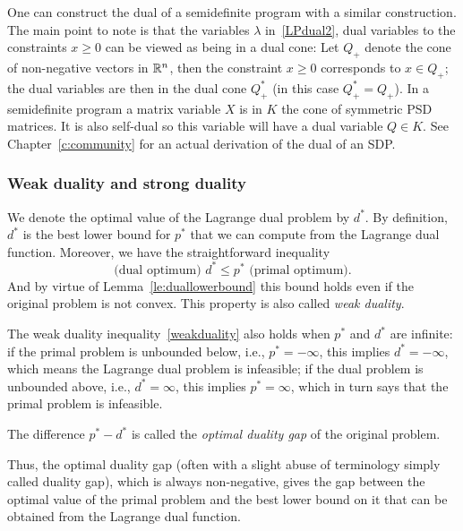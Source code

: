 \begin{remark}
    One can construct the dual of a semidefinite program with a similar construction. The main point to note is that the variables $\lambda$ in~\eqref{LPdual2}, dual variables to the constraints $x\geq 0$ can be viewed as being in a dual cone: Let $Q_+$ denote the cone of non-negative vectors in $\mathbb{R}^n$, then the constraint $x\geq 0$ corresponds to $x\in Q_+$; the dual variables are then in the dual cone $Q_+^\ast$ (in this case $Q_+^\ast=Q_+$). In a semidefinite program a matrix variable $X$ is in $K$ the cone of symmetric PSD matrices. It is also self-dual so this variable will have a dual variable $Q\in K$. See Chapter~\ref{c:community} for an actual derivation of the dual of an SDP.
\end{remark}


\subsubsection{Weak duality and strong duality}\label{ss:weakstrong}
We denote the optimal value of the Lagrange dual problem by $d^*$. By definition, $d^*$ is the best lower bound for $p^*$ that we can compute from the Lagrange dual
function. Moreover, we have the straightforward inequality
\begin{equation}
 \label{weakduality}   
\text{(dual optimum) } d^* \le p^* \text{ (primal optimum)}.
\end{equation}
And by virtue of Lemma~\ref{le:duallowerbound} this bound 
holds even if the original problem is not convex. This property is also called {\em weak duality}.

The weak duality inequality~\eqref{weakduality} also holds when $p^*$ and $d^*$ are infinite: if the primal problem is unbounded below, i.e., $p^* = -\infty$, this implies $d^* = -\infty$, which means  the Lagrange dual problem is infeasible;  if the
dual problem is unbounded above, i.e., $d^* = \infty$, this implies $p^* = \infty$, which in turn says that the
primal problem is infeasible.

\begin{definition}\label{dualitygap}
The difference $p^* - d^*$ is called the 
{\em optimal duality gap} of the original
problem.
\end{definition}
Thus, the optimal duality gap (often with a slight abuse of terminology simply called duality gap), which is always non-negative, gives the gap between the optimal value of the primal problem
and the best lower bound on it that can be obtained from the
Lagrange dual function.

